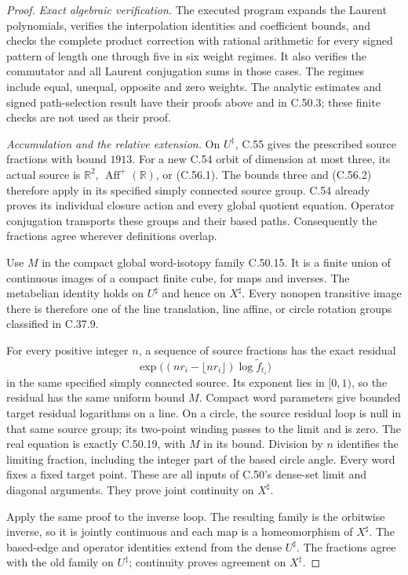 \begin{proof}
\emph{Exact algebraic verification.}
The executed program
expands the Laurent polynomials, verifies the
interpolation identities and coefficient bounds,
and checks the complete product correction with
rational arithmetic for every signed pattern
of length one through five in six weight regimes.
It also verifies the commutator and all Laurent
conjugation sums in those cases.
The regimes include equal, unequal, opposite and
zero weights. The analytic estimates and signed
path-selection result have their proofs above
and in C.50.3; these finite checks are not used
as their proof.

\emph{Accumulation and the relative extension.}
On $U^\ddagger$, C.55 gives the prescribed source
fractions with bound $1913$. For a new C.54 orbit
of dimension at most three, its actual source is
$\mathbb R^2$, $\operatorname{Aff}^+(\mathbb R)$,
or (C.56.1). The bounds three and (C.56.2)
therefore apply in its specified simply connected
source group. C.54 already proves its individual
closure action and every global quotient equation.
Operator conjugation transports these groups and
their based paths. Consequently the fractions
agree wherever definitions overlap.

Use $M$ in the compact global word-isotopy family
C.50.15. It is a finite union of continuous
images of a compact finite cube, for maps and
inverses. The metabelian identity holds on
$U^\sharp$ and hence on $X^\sharp$.
Every nonopen transitive image there is therefore
one of the line translation, line affine, or
circle rotation groups classified in C.37.9.

For every positive integer $n$, a sequence of
source fractions has the exact residual
\[
 \exp\bigl((nr_i-\lfloor nr_i\rfloor)
                         \log\widetilde f_{t_i}\bigr)
\]
in the same specified simply connected source.
Its exponent lies in $[0,1)$, so the residual
has the same uniform bound $M$.
Compact word parameters give bounded target
residual logarithms on a line.
On a circle, the source residual loop is null
in that same source group; its two-point winding
passes to the limit and is zero.
The real equation is exactly C.50.19, with $M$
in its bound. Division by $n$ identifies the
limiting fraction, including the integer part
of the based circle angle. Every word fixes
a fixed target point.
These are all inputs of C.50's dense-set limit
and diagonal arguments. They prove joint
continuity on $X^\sharp$.

Apply the same proof to the inverse loop.
The resulting family is the orbitwise inverse,
so it is jointly continuous and each map is
a homeomorphism of $X^\sharp$.
The based-edge and operator identities extend
from the dense $U^\sharp$.
The fractions agree with the old family on
$U^\ddagger$; continuity proves agreement
on $X^\ddagger$.


\end{proof}
